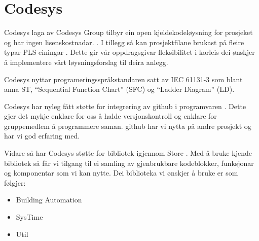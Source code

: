 \section{Codesys}
\thispagestyle{fancy}
\gls{Codesys} \citep{Codesys} laga av \gls{Codesys} Group tilbyr ein open kjeldekodeløysning for prosjeket og har ingen lisenskostnadar. \citep{CodesysLisens}. 
I tillegg så kan prosjektfilane brukast på fleire typar PLS einingar \citep{CodesysPLS}. 
Dette gir vår oppdragsgivar fleksibilitet i korleis dei ønskjer å implementere vårt løysningsforslag til deira anlegg.

\gls{Codesys} nyttar programeringsspråkstandaren satt av \gls{IEC} 61131-3 som blant anna \gls{ST}, ``Sequential Function Chart'' (\gls{SFC}) og ``Ladder Diagram'' (\gls{LD}). 

\gls{Codesys} har nyleg fått støtte for integrering av \gls{github} i programvaren \citep{CodesysGIT}. 
Dette gjer det mykje enklare for oss å halde versjonskontroll
og enklare for gruppemedlem å programmere saman. 
\gls{github} har vi nytta på andre prosjekt og har vi god erfaring med.

Vidare så har \gls{Codesys} støtte for bibliotek igjennom  Store \citep{CodesysStore}. 
Med å bruke kjende bibliotek så får vi tilgang til ei samling av gjenbrukbare kodeblokker, funksjonar og komponentar som vi kan nytte.
Dei biblioteka vi ønskjer å bruke er som følgjer:

\begin{itemize}
    \item {} Building Automation \citep{BuildingAutomation}
    \item SysTime \citep{DateAndTime}
    \item Util \citep{Util}
\end{itemize}


\newpage
